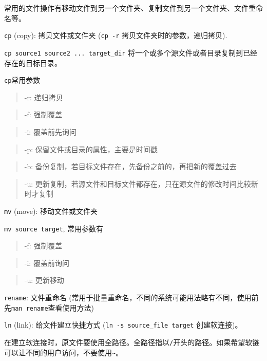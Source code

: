 \documentclass[]{article}
\numberwithin{figure}{section}
\numberwithin{table}{section}
\begin{document}
常用的文件操作有移动文件到另一个文件夹、复制文件到另一个文件夹、文件重命名等。

\texttt{cp} (copy): 拷贝文件或文件夹 (\texttt{cp\ -r} 拷贝文件夹时的参数，递归拷贝).

\texttt{cp\ source1\ source2\ ...\ target\_dir} 将一个或多个源文件或者目录复制到已经存在的目标目录。

\texttt{cp}常用参数

\begin{quote}
-r: 递归拷贝
\end{quote}

\begin{quote}
-f: 强制覆盖
\end{quote}

\begin{quote}
-i: 覆盖前先询问
\end{quote}

\begin{quote}
-p: 保留文件或目录的属性，主要是时间戳
\end{quote}

\begin{quote}
-b: 备份复制，若目标文件存在，先备份之前的，再把新的覆盖过去
\end{quote}

\begin{quote}
-u: 更新复制，若源文件和目标文件都存在，只在源文件的修改时间比较新时才复制
\end{quote}

\texttt{mv} (move): 移动文件或文件夹

\texttt{mv\ source\ target}, 常用参数有

\begin{quote}
-f: 强制覆盖
\end{quote}

\begin{quote}
-i: 覆盖前询问
\end{quote}

\begin{quote}
-u: 更新移动
\end{quote}

\texttt{rename}: 文件重命名 (常用于批量重命名，不同的系统可能用法略有不同，使用前先\texttt{man\ rename}查看使用方法)

\texttt{ln} (link): 给文件建立快捷方式 (\texttt{ln\ -s\ source\_file\ target} 创建软连接)。

在建立软连接时，原文件要使用全路径。全路径指以\texttt{/}开头的路径。如果希望软链可以让不同的用户访问，不要使用\texttt{\textasciitilde{}}。
\end{document}

